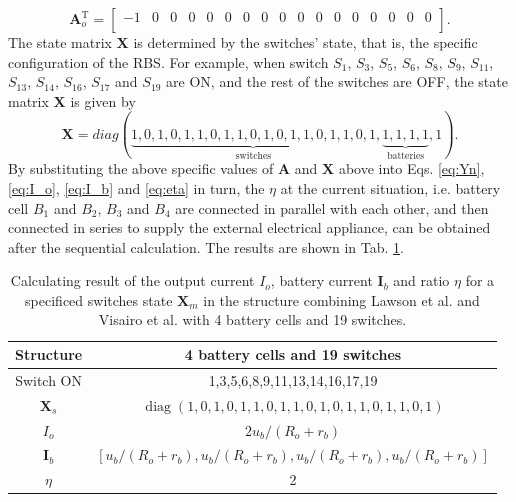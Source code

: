 \documentclass{article}
\DeclareMathOperator{\diag}{diag}
\def\T{\mathrm{T}}
\begin{document}
\begin{equation}
    \bm{A}_o^\T = 
    \begin{bmatrix}
       -1 & 0 & 0 & 0 & 0 & 0 & 0 & 0 & 0 & 0 & 0 & 0 & 0 & 0 & 0 & 0 & 0 \\
    \end{bmatrix}.
\end{equation}
The state matrix $\bm{X}$ is determined by the switches' state, that is, the specific configuration of the RBS.
For example, when switch $S_1$, $S_3$, $S_5$, $S_6$, $S_8$, $S_9$, $S_{11}$, $S_{13}$, $S_{14}$, $S_{16}$, $S_{17}$ and $S_{19}$ are ON, and the rest of the switches are OFF, the state matrix $\bm{X}$ is given by
\begin{equation}
    \bm{X} = diag(
    \underbrace{1,0,1,0,1,1,0,1,1,0,1,0,1,1,0,1,1,0,1}_{\text{switches}},
    \underbrace{1,1,1,1}_{\text{batteries}},
    1
    ).
\end{equation}
By substituting the above specific values of $\bm{A}$ and $\bm{X}$ above into Eqs. \ref{eq:Yn}, \ref{eq:I_o}, \ref{eq:I_b} and \ref{eq:eta} in turn, the $\eta$ at the current situation, i.e. battery cell $B_1$ and $B_2$, $B_3$ and $B_4$ are connected in parallel with each other, and then connected in series to supply the external electrical appliance, can be obtained after the sequential calculation.
The results are shown in Tab. \ref{tab:given_x}.

\begin{table}[htbp]
  \centering
    \caption{Calculating result of the output current $I_o$, battery current $\bm{I}_b$ and ratio $\eta$ for a specificed switches state $\bm{X}_m$ in the structure combining Lawson et al.\cite{lawsonSoftwareConfigurableBattery2012} and Visairo et al.\cite{visairoReconfigurableBatteryPack2008} with 4 battery cells and 19 switches.} %
    \begin{tabular}{cc}
    \toprule
        Structure & 4 battery cells and 19 switches  \\
    \midrule
    Switch ON & 1,3,5,6,8,9,11,13,14,16,17,19 \\
        $\bm{X}_s$ & $\diag(1,0,1,0,1,1,0,1,1,0,1,0,1,1,0,1,1,0,1)$ \\
    \midrule
        $I_o$ & $2u_b/(R_o+r_b)$ \\
        $\bm{I}_b$ & $[u_b/(R_o+r_b),u_b/(R_o+r_b),u_b/(R_o+r_b),u_b/(R_o+r_b)]$ \\
        $\eta$     & 2 \\
    \bottomrule
    \end{tabular}%
  \label{tab:given_x}%
\end{table}%
\end{document}
